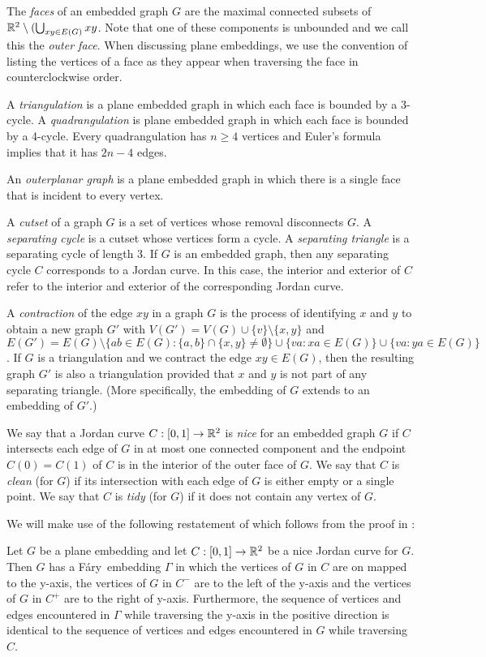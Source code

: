 \documentclass{patmorin}
\newcommand{\Fary}{Fáry}
\begin{document}
The \emph{faces} of an embedded graph $G$ are the maximal connected
subsets of $\mathbb{R}^2\setminus(\bigcup_{xy\in E(G)} xy$.  Note that one of these components is unbounded and we call this the \emph{outer face}. When discussing
plane embeddings, we use the convention of listing the vertices of a
face as they appear when traversing the face in counterclockwise order.

A \emph{triangulation} is a plane embedded graph in which each face is
bounded by a 3-cycle.  A \emph{quadrangulation} is plane embedded graph
in which each face is bounded by a 4-cycle. Every quadrangulation has
$n\ge 4$ vertices and Euler's formula implies that it has $2n-4$ edges.

An \emph{outerplanar graph} is a plane embedded graph in which there is
a single face that is incident to every vertex.

A \emph{cutset} of a graph $G$ is a set of vertices whose removal
disconnects $G$.  A \emph{separating cycle} is a cutset whose vertices
form a cycle.  A \emph{separating triangle} is a separating cycle of
length 3.  If $G$ is an embedded graph, then any separating cycle $C$
corresponds to a Jordan curve.  In this case, the interior and exterior of
$C$ refer to the interior and exterior of the corresponding Jordan curve.


A \emph{contraction} of the edge $xy$ in a graph $G$ is the
process of identifying $x$ and $y$ to obtain a new graph $G'$ with
$V(G')=V(G)\cup\{v\}\setminus\{x,y\}$ and $E(G')=E(G)\setminus\{ab\in
E(G): \{a,b\}\cap\{x,y\}\neq\emptyset\}\cup\{va: xa\in E(G)\}\cup
\{va:ya\in E(G)\}$.  If $G$ is a triangulation and we contract the edge
$xy\in E(G)$, then the resulting graph $G'$ is also a triangulation
provided that $x$ and $y$ is not part of any separating triangle. (More
specifically, the embedding of $G$ extends to an embedding of $G'$.)

We say that a Jordan curve $C:[0,1]\to\mathbb{R}^2$ is \emph{nice} for an embedded
graph $G$ if $C$ intersects each edge of $G$ in at most one connected
component and the endpoint $C(0)=C(1)$ of $C$ is in the interior of the
outer face of $G$.  We say that $C$ is \emph{clean} (for $G$) if its
intersection with each edge of $G$ is either empty or a single point.
We say that $C$ is \emph{tidy} (for $G$) if it does not contain any
vertex of $G$.

We will make use of the following restatement of 
which follows from the proof in \cite{dalozzo.dujmovic.ea:drawing}:
\begin{thm}
   Let $G$ be a plane embedding and let $C:[0,1]\to\mathbb{R}^2$ be a nice
   Jordan curve for $G$.  Then $G$ has a \Fary\ embedding $\Gamma$
   in which the vertices of $G$ in $C$ are on mapped to the y-axis,
   the vertices of $G$ in $C^-$ are to the left of the y-axis and the
   vertices of $G$ in $C^+$ are to the right of y-axis. Furthermore,
   the sequence of vertices and edges encountered in $\Gamma$ while
   traversing the y-axis in the positive direction is identical to the
   sequence of vertices and edges encountered in $G$ while traversing $C$.
\end{thm}
\end{document}
